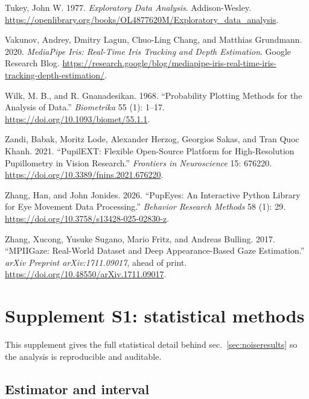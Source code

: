 \documentclass[
]{article}
\newlength{\cslhangindent}
\newenvironment{CSLReferences}[2] %
 {\begin{list}{}{%
  \setlength{\itemindent}{0pt}
  \setlength{\leftmargin}{0pt}
  \setlength{\parsep}{0pt}
  \ifodd #1
   \setlength{\leftmargin}{\cslhangindent}
   \setlength{\itemindent}{-1\cslhangindent}
  \fi
  \setlength{\itemsep}{#2\baselineskip}}}
 {\end{list}}
\begin{document}
\begin{CSLReferences}{1}{1}
Tukey, John W. 1977. \emph{Exploratory Data Analysis}. Addison-Wesley.
\url{https://openlibrary.org/books/OL4877620M/Exploratory_data_analysis}.

Vakunov, Andrey, Dmitry Lagun, Chuo-Ling Chang, and Matthias Grundmann.
2020. \emph{MediaPipe Iris: Real-Time Iris Tracking and Depth
Estimation}. Google Research Blog.
\url{https://research.google/blog/mediapipe-iris-real-time-iris-tracking-depth-estimation/}.

Wilk, M. B., and R. Gnanadesikan. 1968. {``Probability Plotting Methods
for the Analysis of Data.''} \emph{Biometrika} 55 (1): 1--17.
\url{https://doi.org/10.1093/biomet/55.1.1}.

Zandi, Babak, Moritz Lode, Alexander Herzog, Georgios Sakas, and Tran
Quoc Khanh. 2021. {``PupilEXT: Flexible Open-Source Platform for
High-Resolution Pupillometry in Vision Research.''} \emph{Frontiers in
Neuroscience} 15: 676220.
\url{https://doi.org/10.3389/fnins.2021.676220}.

Zhang, Han, and John Jonides. 2026. {``PupEyes: An Interactive Python
Library for Eye Movement Data Processing.''} \emph{Behavior Research
Methods} 58 (1): 29. \url{https://doi.org/10.3758/s13428-025-02830-z}.

Zhang, Xucong, Yusuke Sugano, Mario Fritz, and Andreas Bulling. 2017.
{``MPIIGaze: Real-World Dataset and Deep Appearance-Based Gaze
Estimation.''} \emph{arXiv Preprint arXiv:1711.09017}, ahead of print.
\url{https://doi.org/10.48550/arXiv.1711.09017}.

\end{CSLReferences}

\section{Supplement S1: statistical methods}\label{sec:statmethods}

This supplement gives the full statistical detail behind
sec.~\ref{sec:noiseresults} so the analysis is reproducible and
auditable.

\subsection{Estimator and interval}\label{estimator-and-interval}
\end{document}
